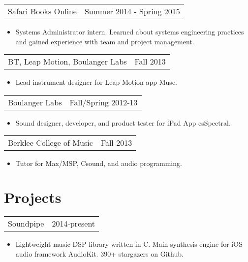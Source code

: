 \documentclass[margin]{res}
\begin{document}
\begin{resume}
\begin{tabular}{p{3in} r} %
Safari Books Online &  Summer 2014 - Spring 2015
\end{tabular}	
\begin{itemize} %
\item[] Systems Administrator intern. Learned about systems engineering 
practices and gained experience with team and project management. 
\end{itemize} 

\begin{tabular}{p{3in} r} %
BT, Leap Motion, Boulanger Labs&  Fall 2013
\end{tabular}	
\begin{itemize} %
\item[] Lead instrument designer for Leap Motion app Muse.
\end{itemize} 

\begin{tabular}{p{3in} r} %
Boulanger Labs&  Fall/Spring 2012-13
\end{tabular}	
\begin{itemize} %
\item[] Sound designer, developer, and product tester for iPad App csSpectral.
\end{itemize} 

\begin{tabular}{p{3in} r} %
Berklee College of Music&  Fall 2013
\end{tabular}	
\begin{itemize} %
\item[] Tutor for Max/MSP, Csound, and audio programming.
\end{itemize} 

\section{Projects}      

\begin{tabular}{p{3in} r} %
Soundpipe & 2014-present
\end{tabular}	
\begin{itemize} %
\item[] Lightweight music DSP library written in C. Main synthesis engine for
iOS audio framework AudioKit. 390+ stargazers on Github.
\end{itemize} 


\end{resume}
\end{document}

